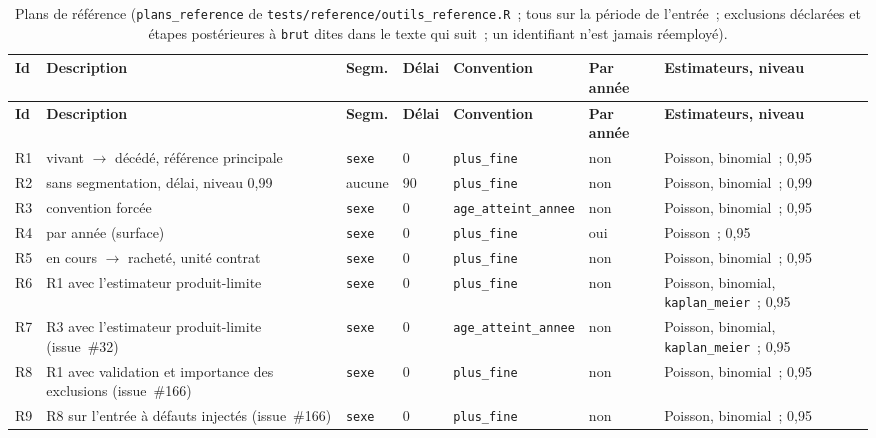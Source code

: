 \documentclass[a4paper,11pt]{article}
\newcommand{\code}[1]{\texttt{\small #1}}
\begin{document}
{\small
{}
\begin{longtable}{@{}p{0.6cm}p{2.8cm}p{1.4cm}p{0.9cm}p{3.2cm}p{1.2cm}p{2.6cm}@{}}
\caption{Plans de référence (\code{plans\_reference} de
\code{tests/reference/outils\_reference.R}~; tous sur la période de l'entrée~;
exclusions déclarées et étapes postérieures à \code{brut} dites dans le
texte qui suit~; un identifiant n'est jamais réemployé).}
\label{tab:plans-reference}\\
\rowcolor{tableheader}
\textcolor{financeblue}{\textbf{Id}} &
\textcolor{financeblue}{\textbf{Description}} &
\textcolor{financeblue}{\textbf{Segm.}} &
\textcolor{financeblue}{\textbf{Délai}} &
\textcolor{financeblue}{\textbf{Convention}} &
\textcolor{financeblue}{\textbf{Par année}} &
\textcolor{financeblue}{\textbf{Estimateurs, niveau}} \\
\endfirsthead
\rowcolor{tableheader}
\textcolor{financeblue}{\textbf{Id}} &
\textcolor{financeblue}{\textbf{Description}} &
\textcolor{financeblue}{\textbf{Segm.}} &
\textcolor{financeblue}{\textbf{Délai}} &
\textcolor{financeblue}{\textbf{Convention}} &
\textcolor{financeblue}{\textbf{Par année}} &
\textcolor{financeblue}{\textbf{Estimateurs, niveau}} \\
\endhead
R1 & vivant $\to$ décédé, référence principale & \code{sexe} & 0 & \code{plus\_fine} & non & Poisson, binomial~; 0,95 \\
R2 & sans segmentation, délai, niveau 0,99 & aucune & 90 & \code{plus\_fine} & non & Poisson, binomial~; 0,99 \\
R3 & convention forcée & \code{sexe} & 0 & \code{age\_atteint\_annee} & non & Poisson, binomial~; 0,95 \\
R4 & par année (surface) & \code{sexe} & 0 & \code{plus\_fine} & oui & Poisson~; 0,95 \\
R5 & en cours $\to$ racheté, unité contrat & \code{sexe} & 0 & \code{plus\_fine} & non & Poisson, binomial~; 0,95 \\
R6 & R1 avec l'estimateur produit-limite & \code{sexe} & 0 & \code{plus\_fine} & non & Poisson, binomial, \code{kaplan\_meier}~; 0,95 \\
R7 & R3 avec l'estimateur produit-limite (issue~\#32) & \code{sexe} & 0 & \code{age\_atteint\_annee} & non & Poisson, binomial, \code{kaplan\_meier}~; 0,95 \\
R8 & R1 avec validation et importance des exclusions (issue~\#166) & \code{sexe} & 0 & \code{plus\_fine} & non & Poisson, binomial~; 0,95 \\
R9 & R8 sur l'entrée à défauts injectés (issue~\#166) & \code{sexe} & 0 & \code{plus\_fine} & non & Poisson, binomial~; 0,95 \\

\end{longtable}}
\end{document}
